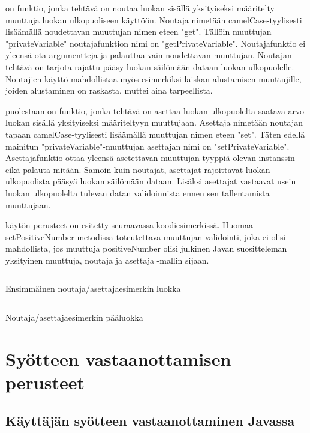 \documentclass{tufte-book}
\newcommand{\code}[3]{
\begin{listing}
    \inputminted{java}{OhjelmointiopasEsimerkit/src/#1/#2.java}
    \caption{#3}
    \label{Java-#1-#2}
\end{listing}
}
\begin{document}
 on funktio, jonka tehtävä on noutaa luokan sisällä yksityiseksi
määritelty muuttuja luokan ulkopuoliseen käyttöön. Noutaja nimetään camelCase-tyylisesti
lisäämällä noudettavan muuttujan nimen eteen "get". Tällöin muuttujan "privateVariable"
noutajafunktion nimi on "getPrivateVariable". Noutajafunktio ei yleensä ota argumentteja ja
palauttaa vain noudettavan muuttujan. Noutajan tehtävä on tarjota rajattu pääsy luokan
säilömään dataan luokan ulkopuolelle. Noutajien käyttö mahdollistaa myös esimerkiksi laiskan
alustamisen muuttujille, joiden alustaminen on raskasta, muttei aina tarpeellista.

 puolestaan on funktio, jonka tehtävä on asettaa luokan
ulkopuolelta saatava arvo luokan sisällä yksityiseksi määriteltyyn muuttujaan. Asettaja nimetään
noutajan tapaan camelCase-tyylisesti lisäämällä muuttujan nimen eteen "set". Täten edellä mainitun
"privateVariable"-muuttujan asettajan nimi on "setPrivateVariable". Asettajafunktio ottaa yleensä
asetettavan muuttujan tyyppiä olevan instanssin eikä palauta mitään. Samoin kuin noutajat,
asettajat rajoittavat luokan ulkopuolista pääsyä luokan säilömään dataan. Lisäksi asettajat
vastaavat usein luokan ulkopuolelta tulevan datan validoinnista ennen sen tallentamista
muuttujaan.

 käytön perusteet on esitetty seuraavassa koodiesimerkissä.
Huomaa setPositiveNumber-metodissa toteutettava muuttujan validointi, joka ei olisi mahdollista,
jos muuttuja positiveNumber olisi julkinen Javan suositteleman yksityinen muuttuja, noutaja ja
asettaja -mallin sijaan.

\code{week2/gettersetterexample}{NumberStorage}{Ensimmäinen noutaja/asettajaesimerkin luokka}
\code{week2/gettersetterexample}{Main}{Noutaja/asettajaesimerkin pääluokka}


\section{Syötteen vastaanottamisen perusteet}
\label{syötteestä}

\subsection{Käyttäjän syötteen vastaanottaminen Javassa}
\label{input}
\end{document}
